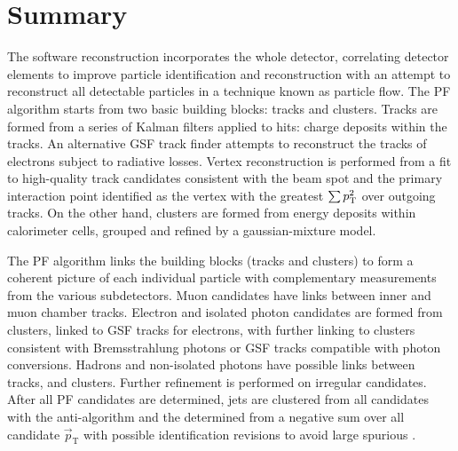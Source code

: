\section{Summary}

The \CMS software reconstruction incorporates the whole detector, correlating
detector elements to improve particle identification and reconstruction with an
attempt to reconstruct all detectable particles in a technique known as
particle flow. The PF algorithm starts from two basic building blocks: tracks
and clusters. Tracks are formed from a series of Kalman filters applied to
hits: charge deposits within the tracks. An alternative GSF track finder
attempts to reconstruct the tracks of electrons subject to radiative losses.
Vertex reconstruction is performed from a fit to high-quality track candidates
consistent with the beam spot and the primary interaction point identified as
the vertex with the greatest $\sum p_{\text{T}}^2$ over outgoing tracks. On the other
hand, clusters are formed from energy deposits within calorimeter cells,
grouped and refined by a gaussian-mixture model. 

The PF algorithm links the building blocks (tracks and clusters) to form a
coherent picture of each individual particle with complementary measurements
from the various subdetectors. Muon candidates have links between inner and
muon chamber tracks. Electron and isolated photon candidates are formed from
\ECAL clusters, linked to GSF tracks for electrons, with further linking to
clusters consistent with Bremsstrahlung photons or GSF tracks compatible with
photon conversions. Hadrons and non-isolated photons have possible links
between tracks, \HCAL and \ECAL clusters. Further refinement is performed on
irregular candidates. After all PF candidates are determined, jets are
clustered from all candidates with the anti-\kt algorithm and the \ptmiss
determined from a negative sum over all candidate $\vec{p}_{\mathrm{T}}$
with possible identification revisions to avoid large spurious
\ptmiss.